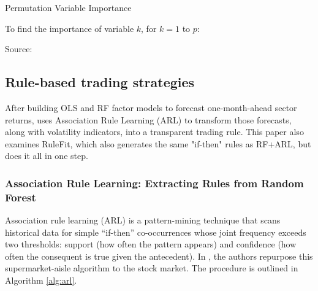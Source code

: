 \begin{algorithm}[H]
    \caption{Permutation Variable Importance}
    \label{alg:fi}
    
    To find the importance of variable $k$, for $k = 1$ to $p$:
    
    Source: \cite{cutler_2012}
    \end{algorithm}



\subsection{Rule-based trading strategies}
After building OLS and RF factor models to forecast one-month-ahead sector returns,  uses Association Rule Learning (ARL) to transform those forecasts, along with volatility indicators, into a transparent trading rule. This paper also examines RuleFit, which also generates the same "if-then" rules as RF+ARL, but does it all in one step.


\subsubsection{Association Rule Learning: Extracting Rules from Random Forest}
Association rule learning (ARL) is a pattern-mining technique that scans historical data for simple “if-then” co-occurrences whose joint frequency exceeds two thresholds: support (how often the pattern appears) and confidence (how often the consequent is true given the antecedent). In , the authors repurpose this supermarket-aisle algorithm to the stock market. The procedure is outlined in Algorithm \ref{alg:arl}.

